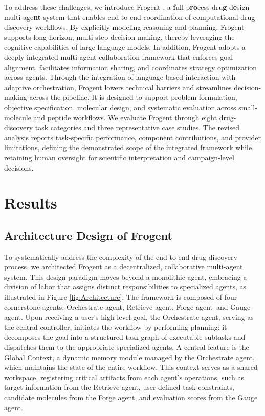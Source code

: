 \documentclass{article}
\newcommand{\name}{Frogent }
\newcommand{\oa}{Orchestrate agent}
\newcommand{\ra}{Retrieve agent}
\newcommand{\fa}{Forge agent}
\newcommand{\ga}{Gauge agent}
\begin{document}
To address these challenges, we introduce \name, a \textbf{f}ull-p\textbf{ro}cess dru\textbf{g} d\textbf{e}sign multi-age\textbf{nt} system that enables end-to-end coordination of computational drug-discovery workflows. By explicitly modeling reasoning and planning, \name supports long-horizon, multi-step decision-making, thereby leveraging the cognitive capabilities of large language models. In addition, \name adopts a deeply integrated multi-agent collaboration framework that enforces goal alignment, facilitates information sharing, and coordinates strategy optimization across agents. Through the integration of language-based interaction with adaptive orchestration, \name lowers technical barriers and streamlines decision-making across the pipeline. It is designed to support problem formulation, objective specification, molecular design, and systematic evaluation across small-molecule and peptide workflows. We evaluate \name through eight drug-discovery task categories and three representative case studies. The revised analysis reports task-specific performance, component contributions, and provider limitations, defining the demonstrated scope of the integrated framework while retaining human oversight for scientific interpretation and campaign-level decisions.



\section*{Results}

\subsection*{Architecture Design of Frogent}
To systematically address the complexity of the end-to-end drug discovery process, we architected \name as a decentralized, collaborative multi-agent system. This design paradigm moves beyond a monolithic agent, embracing a division of labor that assigns distinct responsibilities to specialized agents, as illustrated in Figure \ref{fig:Architecture}. The framework is composed of four cornerstone agents: \oa, \ra, \fa \ and \ga. Upon receiving a user's high-level goal, the \oa, serving as the central controller, initiates the workflow by performing planning: it decomposes the goal into a structured task graph of executable subtasks and dispatches them to the appropriate specialized agents. A central feature is the Global Context, a dynamic memory module managed by the \oa, which maintains the state of the entire workflow. This context serves as a shared workspace, registering critical artifacts from each agent's operations, such as target information from the \ra, user-defined task constraints, candidate molecules from the \fa, and evaluation scores from the \ga.
\end{document}
